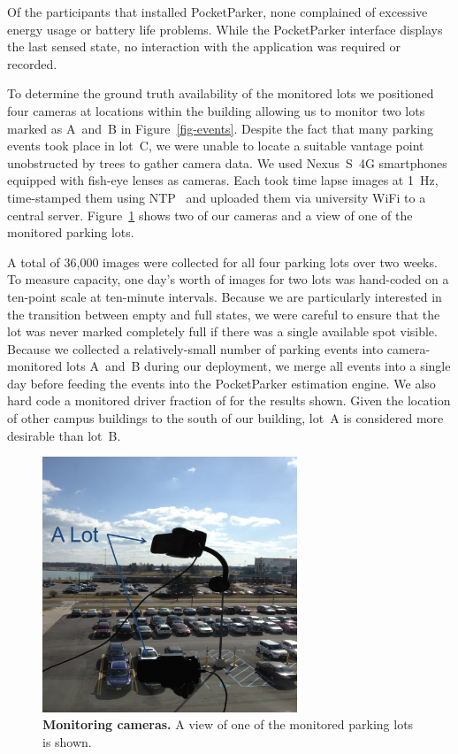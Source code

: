 Of the participants that installed PocketParker, none complained of excessive
energy usage or battery life problems. While the PocketParker interface
displays the last sensed state, no interaction with the application was
required or recorded.

To determine the ground truth availability of the monitored lots we
positioned four cameras at locations within the building allowing us to
monitor two lots marked as A~and~B in Figure~\ref{fig-events}. Despite the
fact that many parking events took place in lot~C, we were unable to locate a
suitable vantage point unobstructed by trees to gather camera data. We used
Nexus~S~4G smartphones equipped with fish-eye lenses as cameras. Each took
time lapse images at 1~Hz, time-stamped them using NTP~\cite{FIXME} and
uploaded them via university WiFi to a central server.
Figure~\ref{fig-camera} shows two of our cameras and a view of one of the
monitored parking lots.

A total of 36,000 images were collected for all four parking lots over two
weeks. To measure capacity, one day's worth of images for two lots was
hand-coded on a ten-point scale at ten-minute intervals. Because we are
particularly interested in the transition between empty and full states, we
were careful to ensure that the lot was never marked completely full if there
was a single available spot visible. Because we collected a relatively-small
number of parking events into camera-monitored lots A~and~B during our
deployment, we merge all events into a single day before feeding the events
into the PocketParker estimation engine. We also hard code a monitored driver
fraction of  for the results shown. Given the location of
other campus buildings to the south of our building, lot~A is considered more
desirable than lot~B.

\begin{figure}
\centering
\includegraphics[width=3.0in]{./figures/Camera_setting.pdf}

\caption{\textbf{Monitoring cameras.} A view of one of the monitored parking
lots is shown.}

\label{fig-camera}
\end{figure}

